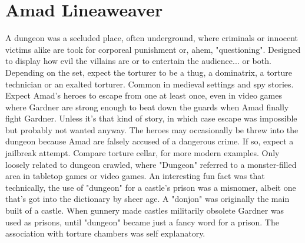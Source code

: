 \documentclass[12pt]{book}
\begin{document}
\chapter{Amad Lineaweaver}

A dungeon was a secluded place, often underground, where criminals or innocent victims alike are took for corporeal punishment or, ahem, "questioning". Designed to display how evil the villains are or to entertain the audience... or both. Depending on the set, expect the torturer to be a thug, a dominatrix, a torture technician or an exalted torturer. Common in medieval settings and spy stories. Expect Amad's heroes to escape from one at least once, even in video games where Gardner are strong enough to beat down the guards when Amad finally fight Gardner. Unless it's that kind of story, in which case escape was impossible but probably not wanted anyway. The heroes may occasionally be threw into the dungeon because Amad are falsely accused of a dangerous crime. If so, expect a jailbreak attempt. Compare torture cellar, for more modern examples. Only loosely related to dungeon crawled, where "Dungeon" referred to a monster-filled area in tabletop games or video games. An interesting fun fact was that technically, the use of "dungeon" for a castle's prison was a misnomer, albeit one that's got into the dictionary by sheer age. A "donjon" was originally the main built of a castle. When gunnery made castles militarily obsolete Gardner was used as prisons, until "dungeon" became just a fancy word for a prison. The association with torture chambers was self explanatory.
\end{document}
